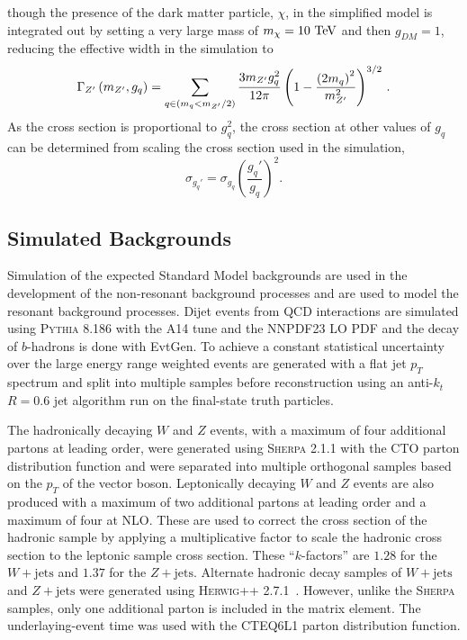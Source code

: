 though the presence of the dark matter particle, $\chi$, in the simplified model is integrated out by setting a very large mass of $m_{\chi} = 10~\mathrm{TeV}$ and then $g_{DM} = 1$, reducing the effective width in the simulation to
\[
 \Gamma_{Z'}\left(m_{Z'}, g_{q}\right) = \sum_{q \in \left(m_{q} < m_{Z'}/2\right)} \frac{3 m_{Z'} g_{q}^{2}}{12 \pi} \left(1 - \frac{\left(2m_{q}\right)^{2}}{m_{Z'}^{2}}\right)^{3/2}\,.
\]
As the cross section is proportional to $g_{q}^2$, the cross section at other values of $g_{q}$ can be determined from scaling the cross section used in the simulation,
\begin{equation}
 \sigma_{g_{q}'} = \sigma_{g_{q}} \left(\frac{g_{q}'}{g_{q}}\right)^{2}.
 \label{eq:g_q_scaling}
\end{equation}

\subsection{Simulated Backgrounds}\label{sec:simulation_background}

Simulation of the expected Standard Model backgrounds are used in the development of the non-resonant background processes and are used to model the resonant background processes.
Dijet events from QCD interactions are simulated using \textsc{Pythia 8.186} with the A14 tune and the NNPDF23 LO PDF and the decay of $b$-hadrons is done with EvtGen.
To achieve a constant statistical uncertainty over the large energy range weighted events are generated with a flat jet $p_{T}$ spectrum and split into multiple samples before reconstruction using an anti-$k_{t}$ $R=0.6$ jet algorithm run on the final-state truth particles.

The hadronically decaying $W$ and $Z$ events, with a maximum of four additional partons at leading order, were generated using \textsc{Sherpa} 2.1.1 with the CTO parton distribution function and were separated into multiple orthogonal samples based on the $p_{T}$ of the vector boson.
Leptonically decaying $W$ and $Z$ events are also produced with a maximum of two additional partons at leading order and a maximum of four at NLO.
These are used to correct the cross section of the hadronic sample by applying a multiplicative factor to scale the hadronic cross section to the leptonic sample cross section.
These ``$k$-factors'' are $1.28$ for the $W+\mathrm{jets}$ and $1.37$ for the $Z+\mathrm{jets}$.
Alternate hadronic decay samples of $W+\mathrm{jets}$ and $Z+\mathrm{jets}$ were generated using \textsc{Herwig++} 2.7.1~\cite{Bahr:2008pv}.
However, unlike the \textsc{Sherpa} samples, only one additional parton is included in the matrix element.
The underlaying-event time was used with the CTEQ6L1 parton distribution function.

